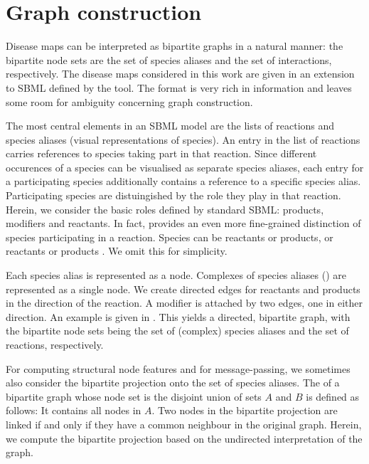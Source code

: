 \documentclass[
	fontsize=10pt, %
	twoside=true, %
	secnumdepth=1, %
  toc=indentunnumbered %
]{kaobook}
\begin{document}
\section{Graph construction}
\label{sec:graph-interpretation}
Disease maps can be interpreted as bipartite graphs in a natural manner: the
bipartite node sets are the set of species aliases and the set of interactions,
respectively. The disease maps considered in this work are given in an extension
to SBML defined by the  tool. The format is very rich in
information and leaves some room for ambiguity concerning graph construction. 

The most central elements in an SBML model are the lists of reactions and
species aliases (visual representations of species). 
%
An entry in the list of reactions carries references to species taking part in
that reaction. Since different occurences of a species can be visualised as
separate species aliases, each entry for a participating species additionally
contains a reference to a specific species alias. Participating species are
distuingished by the role they play in that reaction. Herein, we consider the
basic roles defined by standard SBML: products, modifiers and reactants. In
fact,  provides an even more fine-grained distinction of
species participating in a reaction. Species can be  reactants or
products,  or  reactants or products
\cite{_CellDesignerExtensionTag_2010}. We omit
this for simplicity.

Each species alias is represented as a node. Complexes of species aliases
() are represented as a single node. We create
directed edges for reactants and products in the direction of the reaction. A
modifier is attached by two edges, one in either direction. An example is given
in . This yields a directed, bipartite graph, with
the bipartite node sets being the set of (complex) species aliases and the set
of reactions, respectively.

For computing structural node features and for message-passing, we sometimes
also consider the bipartite projection onto the set of species aliases. The
 of a bipartite graph whose node set is the
disjoint union of sets $A$ and $B$ is defined as follows: It contains all nodes
in $A$. Two nodes in the bipartite projection are linked if and only if they
have a common neighbour in the original graph. Herein, we compute the bipartite
projection based on the undirected interpretation of the graph.
\end{document}
